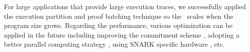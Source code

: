 For large applications that provide large execution traces, we successfully applied the execution partition and proof batching technique so the \zkwasm\, scales when the program size grows. Regarding the performance, various optimization can be applied in the future including improving the commitment scheme \cite{chen2022hyperplonk}, adopting a better parallel computing strategy \cite{wu2018dizk}, using SNARK specific hardware \cite{peng2020design, xavier2022pipemsm}, etc.

